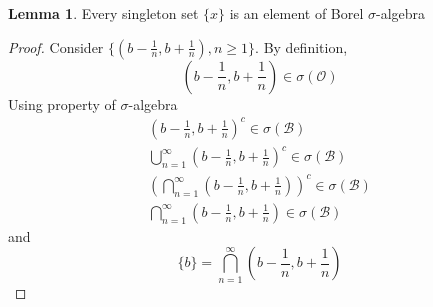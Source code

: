 \documentclass{article}
\theoremstyle{definition}
\theoremstyle{definition}
\newtheorem{lemma}{Lemma}
\begin{document}
\begin{lemma}
	Every singleton set $\{x\}$ is an element of Borel $\sigma$-algebra
\end{lemma}
\begin{proof}
	Consider $\{( b - \frac{1}{n},b+\frac{1}{n}),n \ge 1 \}$. By definition,
	\begin{equation*}
		( b - \frac{1}{n},b+\frac{1}{n}) \in \sigma(\mathcal{O})
	\end{equation*}
	Using property of $\sigma$-algebra
	\begin{align*}
	( b - \frac{1}{n},b+\frac{1}{n})^c \in \sigma(\mathcal{B}) \\
		\bigcup_{n=1}^{\infty} ( b - \frac{1}{n},b+\frac{1}{n})^c \in \sigma(\mathcal{B}) \\
		(\bigcap_{n=1}^{\infty} ( b - \frac{1}{n},b+\frac{1}{n}))^c \in \sigma(\mathcal{B}) \\
		\bigcap_{n=1}^{\infty} ( b - \frac{1}{n},b+\frac{1}{n}) \in \sigma(\mathcal{B})	
	\end{align*}
	and 
	\begin{equation*}
		\{b\}= \bigcap^{\infty}_{n=1}(b-\frac{1}{n}, b+\frac{1}{n})	
	\end{equation*}
	
\end{proof}
\end{document}
